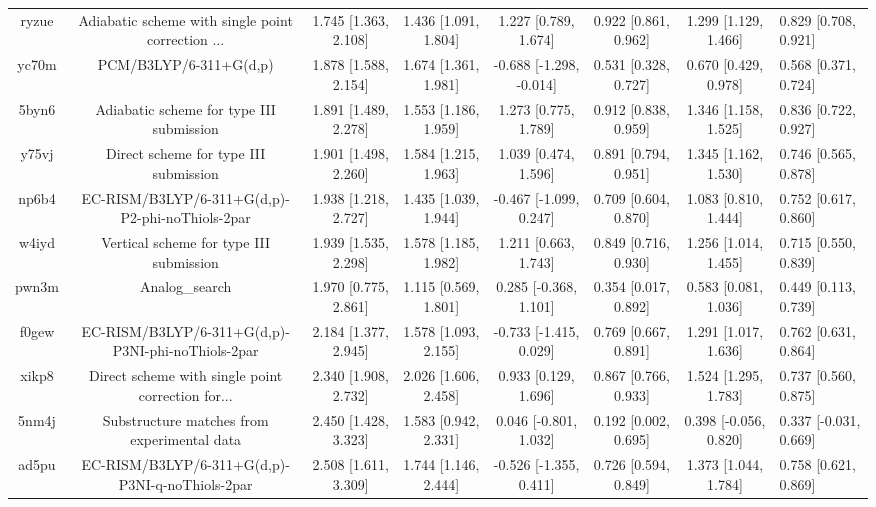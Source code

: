 \documentclass{article}
\begin{document}
\begin{center}
\begin{longtable}{|ccccccc|}
 ryzue &  Adiabatic scheme with single point correction ... &  1.745 [1.363, 2.108] &  1.436 [1.091, 1.804] &     1.227 [0.789, 1.674] &  0.922 [0.861, 0.962] &   1.299 [1.129, 1.466] &   0.829 [0.708, 0.921] \\
 yc70m &                             PCM/B3LYP/6-311+G(d,p) &  1.878 [1.588, 2.154] &  1.674 [1.361, 1.981] &  -0.688 [-1.298, -0.014] &  0.531 [0.328, 0.727] &   0.670 [0.429, 0.978] &   0.568 [0.371, 0.724] \\
 5byn6 &           Adiabatic scheme for type III submission &  1.891 [1.489, 2.278] &  1.553 [1.186, 1.959] &     1.273 [0.775, 1.789] &  0.912 [0.838, 0.959] &   1.346 [1.158, 1.525] &   0.836 [0.722, 0.927] \\
 y75vj &              Direct scheme for type III submission &  1.901 [1.498, 2.260] &  1.584 [1.215, 1.963] &     1.039 [0.474, 1.596] &  0.891 [0.794, 0.951] &   1.345 [1.162, 1.530] &   0.746 [0.565, 0.878] \\
 np6b4 &    EC-RISM/B3LYP/6-311+G(d,p)-P2-phi-noThiols-2par &  1.938 [1.218, 2.727] &  1.435 [1.039, 1.944] &   -0.467 [-1.099, 0.247] &  0.709 [0.604, 0.870] &   1.083 [0.810, 1.444] &   0.752 [0.617, 0.860] \\
 w4iyd &            Vertical scheme for type III submission &  1.939 [1.535, 2.298] &  1.578 [1.185, 1.982] &     1.211 [0.663, 1.743] &  0.849 [0.716, 0.930] &   1.256 [1.014, 1.455] &   0.715 [0.550, 0.839] \\
 pwn3m &                                     Analog\_search &  1.970 [0.775, 2.861] &  1.115 [0.569, 1.801] &    0.285 [-0.368, 1.101] &  0.354 [0.017, 0.892] &   0.583 [0.081, 1.036] &   0.449 [0.113, 0.739] \\
 f0gew &  EC-RISM/B3LYP/6-311+G(d,p)-P3NI-phi-noThiols-2par &  2.184 [1.377, 2.945] &  1.578 [1.093, 2.155] &   -0.733 [-1.415, 0.029] &  0.769 [0.667, 0.891] &   1.291 [1.017, 1.636] &   0.762 [0.631, 0.864] \\
 xikp8 &  Direct scheme with single point correction for... &  2.340 [1.908, 2.732] &  2.026 [1.606, 2.458] &     0.933 [0.129, 1.696] &  0.867 [0.766, 0.933] &   1.524 [1.295, 1.783] &   0.737 [0.560, 0.875] \\
 5nm4j &        Substructure matches from experimental data &  2.450 [1.428, 3.323] &  1.583 [0.942, 2.331] &    0.046 [-0.801, 1.032] &  0.192 [0.002, 0.695] &  0.398 [-0.056, 0.820] &  0.337 [-0.031, 0.669] \\
 ad5pu &    EC-RISM/B3LYP/6-311+G(d,p)-P3NI-q-noThiols-2par &  2.508 [1.611, 3.309] &  1.744 [1.146, 2.444] &   -0.526 [-1.355, 0.411] &  0.726 [0.594, 0.849] &   1.373 [1.044, 1.784] &   0.758 [0.621, 0.869] \\

\end{longtable}
\end{center}
\end{document}
